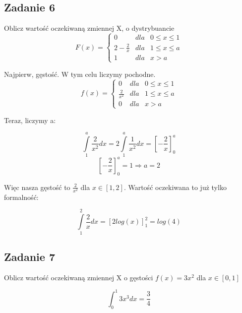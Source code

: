 \documentclass[a4paper]{article}
\begin{document}
\subsection*{Zadanie 6}
Oblicz wartość oczekiwaną zmiennej X, o dystrybuancie
$$F(x)=\left\{\begin{matrix}
0 & dla  & 0\leq x\leq 1 \\ 
2-\frac{2}{x} & dla  & 1\leq x\leq a \\ 
1 & dla  & x>a 
\end{matrix}\right.$$

Najpierw, gęstość. W tym celu liczymy pochodne.
$$f(x)=\left\{\begin{matrix}
0 & dla  & 0\leq x\leq 1 \\ 
\frac{2}{x^2} & dla  & 1\leq x\leq a \\ 
0 & dla  & x>a 
\end{matrix}\right.$$

Teraz, liczymy a:

$$\int\limits_1^a \frac{2}{x^2} dx = 2\int\limits_1^a \frac{1}{x^2} dx = \left[-\frac{2}{x}\right]_0^a $$
$$\left[-\frac{2}{x}\right]_0^a = 1 \Rightarrow a=2$$

Więc nasza gęstość to $\frac{2}{x^2}$ dla $x\in [1,2]$. Wartość oczekiwana to już tylko formalność:

$$\int\limits_1^2 \frac{2}{x} dx = \left[2log(x)\right]_1^2 = log(4)$$

\subsection*{Zadanie 7}
Oblicz wartość oczekiwaną zmiennej X o gęstości $f(x)=3x^2$ dla $x\in [0,1]$

$$\int_0^1 3x^3 dx = \frac{3}{4} $$
\end{document}
